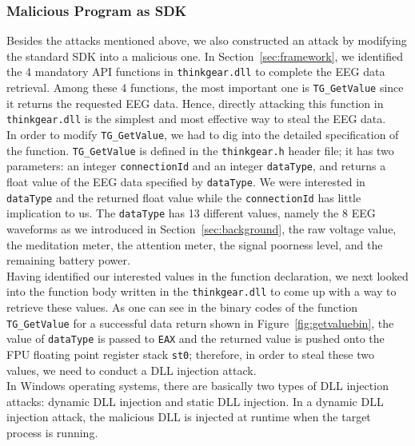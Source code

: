 \subsubsection{Malicious Program as SDK}\label{sec:malicious:SDK}
Besides the attacks mentioned above, we also constructed an attack by modifying the standard SDK into a malicious one. In Section~\ref{sec:framework}, we identified the 4 mandatory API functions in \texttt{thinkgear.dll} to complete the EEG data retrieval. Among these 4 functions, the most important one is \texttt{TG\_GetValue} since it returns the requested EEG data. Hence, directly attacking this function in \texttt{thinkgear.dll} is the simplest and most effective way to steal the EEG data. \\
%
\indent In order to modify \texttt{TG\_GetValue}, we had to dig into the detailed specification of the function. \texttt{TG\_GetValue} is defined in the \texttt{thinkgear.h} header file; it has two parameters: an integer \texttt{connectionId} and an integer \texttt{dataType}, and returns a float value of the EEG data specified by \texttt{dataType}. We were interested in \texttt{dataType} and the returned float value while the \texttt{connectionId} has little implication to us. The \texttt{dataType} has 13 different values, namely the 8 EEG waveforms as we introduced in Section~\ref{sec:background}, the raw voltage value, the meditation meter, the attention meter, the signal poorness level, and the remaining battery power.\\
%
\indent Having identified our interested values in the function declaration, we next looked into the function body written in the \texttt{thinkgear.dll} to come up with a way to retrieve these values. As one can see in the binary codes of the function \texttt{TG\_GetValue} for a successful data return shown in Figure~\ref{fig:getvaluebin}, the value of \texttt{dataType} is passed to \texttt{EAX} and the returned value is pushed onto the FPU floating point register stack \texttt{st0}; therefore, in order to steal these two values, we need to conduct a DLL injection attack.\\
%
\indent In Windows operating systems, there are basically two types of DLL injection attacks: dynamic DLL injection and static DLL injection. In a dynamic DLL injection attack, the malicious DLL is injected at runtime when the target process is running. %

